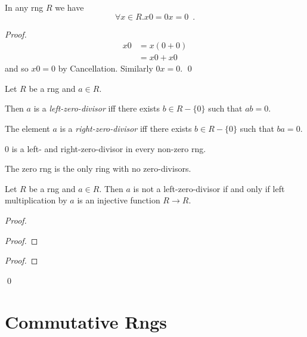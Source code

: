 \begin{prop}
In any rng $R$ we have
\[ \forall x \in R. x0 = 0x = 0 \enspace . \]
\end{prop}

\begin{proof}
\pf
\begin{align*}
x0 & = x(0+0) \\
& = x0+x0
\end{align*}
and so $x0 = 0$ by Cancellation. Similarly $0x = 0$. \qed
\end{proof}

\begin{df}
Let $R$ be a rng and $a \in R$.

Then $a$ is a \emph{left-zero-divisor} iff there exists $b \in R - \{0\}$ such that $ab = 0$.

The element $a$ is a \emph{right-zero-divisor} iff there exists $b \in R - \{0\}$ such that $ba = 0$.
\end{df}

\begin{ex}
0 is a left- and right-zero-divisor in every non-zero rng.

The zero rng is the only ring with no zero-divisors.
\end{ex}

\begin{prop}
Let $R$ be a rng and $a \in R$. Then $a$ is not a left-zero-divisor if and only if left multiplication by $a$ is an injective function $R \rightarrow R$.
\end{prop}

\begin{proof}
\pf
{}
\begin{proof}
\end{proof}
\begin{proof}
\end{proof}
\qed
\end{proof}

\section{Commutative Rngs}

